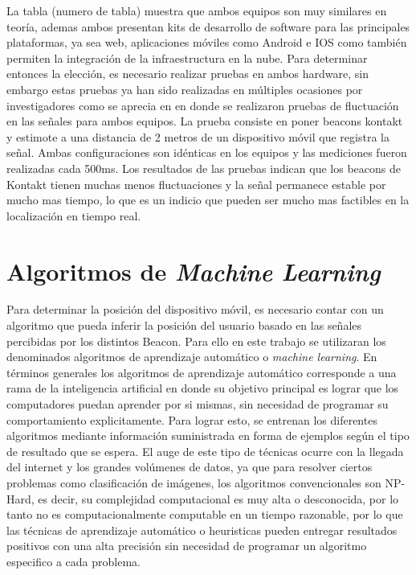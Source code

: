 La tabla (numero de tabla) muestra que ambos equipos son muy similares en teoría, ademas ambos presentan kits de desarrollo de software para las principales plataformas, ya sea web, aplicaciones móviles como Android e IOS como también permiten la integración de la infraestructura en la nube. Para determinar entonces la elección, es necesario realizar pruebas en ambos hardware, sin embargo estas pruebas ya han sido realizadas en múltiples ocasiones por investigadores como se aprecia en \citep{comparativaKontakt} en donde se realizaron pruebas de fluctuación en las señales para ambos equipos. La prueba consiste en poner beacons kontakt y estimote a una distancia de 2 metros de un dispositivo móvil que registra la señal. Ambas configuraciones son idénticas en los equipos y las mediciones fueron realizadas cada 500ms. Los resultados de las pruebas indican que los beacons de Kontakt tienen muchas menos fluctuaciones y la señal permanece estable por mucho mas tiempo, lo que es un indicio que pueden ser mucho mas factibles en la localización en tiempo real.


\section{Algoritmos de \textit{Machine Learning}}

Para determinar la posición del dispositivo móvil, es necesario contar con un algoritmo que pueda inferir la posición del usuario basado en las señales percibidas por los distintos Beacon. Para ello en este trabajo se utilizaran los denominados algoritmos de aprendizaje automático o \textit{machine learning}. En términos generales los algoritmos de aprendizaje automático corresponde a una rama de la inteligencia artificial en donde su objetivo principal es lograr que los computadores puedan aprender por si mismas, sin necesidad de programar su comportamiento explicitamente. Para lograr esto, se entrenan los diferentes algoritmos mediante información suministrada en forma de ejemplos según el tipo de resultado que se espera. El auge de este tipo de técnicas ocurre con la llegada del internet y los grandes volúmenes de datos, ya que para resolver ciertos problemas como clasificación de imágenes, los algoritmos convencionales son NP-Hard, es decir, su complejidad computacional es muy alta o desconocida, por lo tanto no es computacionalmente computable en un tiempo razonable, por lo que las técnicas de aprendizaje automático o heuristicas pueden entregar resultados positivos con una alta precisión sin necesidad de programar un algoritmo especifico a cada problema.

